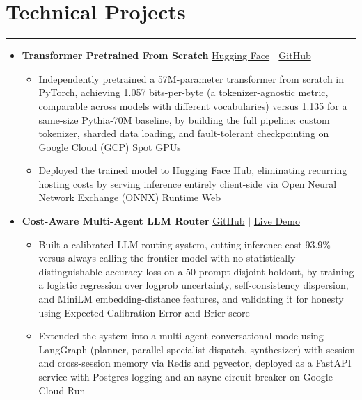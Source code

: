 \documentclass[11pt]{article}
\begin{document}
\section*{Technical Projects}
\hrule
\vspace{-0.3em}
\begin{itemize}[label={}, leftmargin=0pt]
    \item \textbf{Transformer Pretrained From Scratch}
    \hfill \href{https://huggingface.co/spaces/hari-8/transformer-pretraining-demo}{Hugging Face} $|$ \href{https://github.com/Hariprashad-Ravikumar/transformer-pretraining-from-scratch}{GitHub} \\
    \vspace{-2em}
    \begin{itemize}
        \item Independently pretrained a 57M-parameter transformer from scratch in PyTorch, achieving 1.057 bits-per-byte (a tokenizer-agnostic metric, comparable across models with different vocabularies) versus 1.135 for a same-size Pythia-70M baseline, by building the full pipeline: custom tokenizer, sharded data loading, and fault-tolerant checkpointing on Google Cloud (GCP) Spot GPUs
        \item Deployed the trained model to Hugging Face Hub, eliminating recurring hosting costs by serving inference entirely client-side via Open Neural Network Exchange (ONNX) Runtime Web
    \end{itemize}
    
    \item \textbf{Cost-Aware Multi-Agent LLM Router}
    \hfill \href{https://github.com/Hariprashad-Ravikumar/Cost-Aware-Multi-Agent-LLM-Router}{GitHub} $|$ \href{https://calibrated-router-768949786238.us-central1.run.app/}{Live Demo} \\
    \vspace{-2em}
    \begin{itemize}
        \item Built a calibrated LLM routing system, cutting inference cost 93.9\% versus always calling the frontier model with no statistically distinguishable accuracy loss on a 50-prompt disjoint holdout, by training a logistic regression over logprob uncertainty, self-consistency dispersion, and MiniLM embedding-distance features, and validating it for honesty using Expected Calibration Error and Brier score
        \item Extended the system into a multi-agent conversational mode using LangGraph (planner, parallel specialist dispatch, synthesizer) with session and cross-session memory via Redis and pgvector, deployed as a FastAPI service with Postgres logging and an async circuit breaker on Google Cloud Run
    \end{itemize}
\end{itemize}
\end{document}
